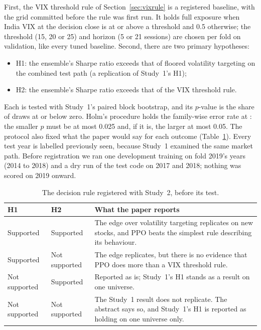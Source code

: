 \documentclass[11pt]{article}
\begin{document}
First, the VIX threshold rule of Section~\ref{sec:vixrule} is a registered baseline, with the grid committed before the rule was first run. It holds full exposure when India VIX at the decision close is at or above a threshold and 0.5 otherwise; the threshold (15, 20 or 25) and horizon (5 or 21 sessions) are chosen per fold on validation, like every tuned baseline. Second, there are two primary hypotheses:
\begin{itemize}
\item H1: the ensemble's Sharpe ratio exceeds that of floored volatility targeting on the combined test path (a replication of Study~1's H1);
\item H2: the ensemble's Sharpe ratio exceeds that of the VIX threshold rule.
\end{itemize}
Each is tested with Study~1's paired block bootstrap, and its $p$-value is the share of draws at or below zero. Holm's procedure holds the family-wise error rate at \NxAlpha{}: the smaller $p$ must be at most 0.025 and, if it is, the larger at most 0.05. The protocol also fixed what the paper would say for each outcome (Table~\ref{tab:decision}). Every test year is labelled previously seen, because Study~1 examined the same market path. Before registration we ran one development training on fold 2019's years (2014 to 2018) and a dry run of the test code on 2017 and 2018; nothing was scored on 2019 onward.

\begin{table}[!htbp]
\centering\small
\caption{The decision rule registered with Study~2, before its test.}
\label{tab:decision}
\begin{tabular}{llp{9.2cm}}
\toprule
H1 & H2 & What the paper reports \\
\midrule
Supported & Supported & The edge over volatility targeting replicates on new stocks, and PPO beats the simplest rule describing its behaviour. \\
Supported & Not supported & The edge replicates, but there is no evidence that PPO does more than a VIX threshold rule. \\
Not supported & Supported & Reported as is; Study~1's H1 stands as a result on one universe. \\
Not supported & Not supported & The Study~1 result does not replicate. The abstract says so, and Study~1's H1 is reported as holding on one universe only. \\
\bottomrule
\end{tabular}
\end{table}
\end{document}
